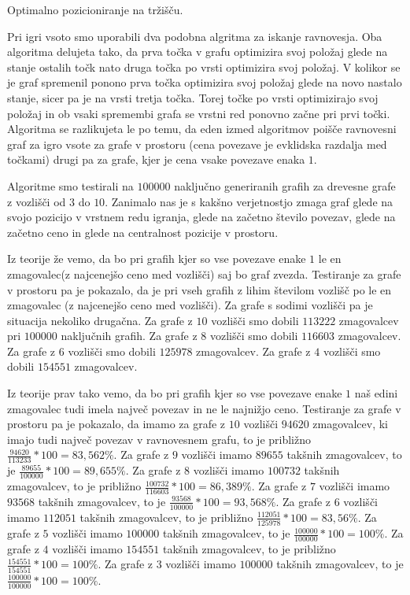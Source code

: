 \documentclass[fin1, tisk]{fmfdelo}
\begin{document}
Optimalno pozicioniranje na tržišču. 

Pri igri vsoto smo uporabili dva podobna algritma za iskanje ravnovesja.
Oba algoritma delujeta tako, da prva točka v grafu optimizira svoj položaj glede na stanje ostalih točk nato druga točka po vrsti optimizira svoj položaj.
V kolikor se je graf spremenil ponono prva točka optimizira svoj položaj glede na novo nastalo stanje, sicer pa je na vrsti tretja točka.
Torej točke po vrsti optimizirajo svoj položaj in ob vsaki spremembi grafa se vrstni red ponovno začne pri prvi točki.
Algoritma se razlikujeta le po temu, da eden izmed algoritmov poišče ravnovesni graf za igro vsote za grafe v prostoru
(cena povezave je evklidska razdalja med točkami) drugi pa za grafe, kjer je cena vsake povezave enaka $1$.

Algoritme smo testirali na $100000$ naključno generiranih grafih za drevesne grafe z vozlišči od $3$ do $10$.
Zanimalo nas je s kakšno verjetnostjo zmaga graf glede na svojo pozicijo v vrstnem redu igranja, glede na začetno število povezav,
glede na začetno ceno in glede na centralnost pozicije v prostoru.

Iz teorije že vemo, da bo pri grafih kjer so vse povezave enake $1$ le en zmagovalec(z najcenejšo ceno med vozlišči) saj bo graf zvezda.
Testiranje za grafe v prostoru pa je pokazalo, da je pri vseh grafih z lihim številom vozlišč po le en zmagovalec (z najcenejšo ceno med vozlišči).
Za grafe s sodimi vozlišči pa je situacija nekoliko drugačna. Za grafe z $10$ vozlišči smo dobili $113222$ zmagovalcev pri $100000$ naključnih grafih.
Za grafe z $8$ vozlišči smo dobili $116603$ zmagovalcev.
Za grafe z $6$ vozlišči smo dobili $125978$ zmagovalcev.
Za grafe z $4$ vozlišči smo dobili $154551$ zmagovalcev.

Iz teorije prav tako vemo, da bo pri grafih kjer so vse povezave enake $1$ naš edini zmagovalec tudi imela največ povezav in ne le najnižjo ceno.
Testiranje za grafe v prostoru pa je pokazalo, da imamo za grafe z $10$ vozlišči $94620$ zmagovalcev, ki imajo tudi največ povezav v ravnovesnem grafu, to je približno $\frac{94620}{113233}*100 = 83,562 \%$.
Za grafe z $9$ vozlišči imamo $89655$ takšnih zmagovalcev, to je $\frac{89655}{100000}*100 = 89,655 \%$.
Za grafe z $8$ vozlišči imamo $100732$ takšnih zmagovalcev, to je približno $\frac{100732}{116603}*100 = 86,389 \%$.
Za grafe z $7$ vozlišči imamo $93568$ takšnih zmagovalcev, to je $\frac{93568}{100000}*100 = 93,568 \%$.
Za grafe z $6$ vozlišči imamo $112051$ takšnih zmagovalcev, to je približno $\frac{112051}{125978}*100 = 83,56 \%$.
Za grafe z $5$ vozlišči imamo $100000$ takšnih zmagovalcev, to je $\frac{100000}{100000}*100 = 100 \%$.
Za grafe z $4$ vozlišči imamo $154551$ takšnih zmagovalcev, to je približno $\frac{154551}{154551}*100 = 100 \%$.
Za grafe z $3$ vozlišči imamo $100000$ takšnih zmagovalcev, to je $\frac{100000}{100000}*100 = 100 \%$.
\end{document}
